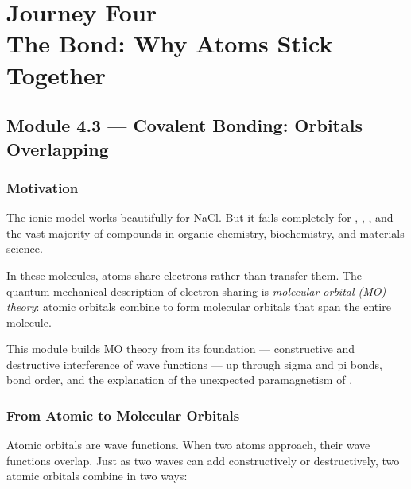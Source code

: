 \documentclass[12pt, a4paper]{book}
\newcommand{\newterm}[1]{\textit{\textcolor{DiscoveryColor}{#1}}}
\begin{document}
\setcounter{chapter}{3}
\chapter[Journey 4 --- The Bond]{Journey Four\\[8pt]
  \textcolor{ModuleColor}{\large The Bond: Why Atoms Stick Together}}
\setcounter{section}{2}

\section{Module 4.3 --- Covalent Bonding: Orbitals Overlapping}

\subsection*{Motivation}

The ionic model works beautifully for NaCl.
But it fails completely for , , ,
and the vast majority of compounds in organic chemistry,
biochemistry, and materials science.

In these molecules, atoms share electrons rather than
transfer them.
The quantum mechanical description of electron sharing
is \newterm{molecular orbital (MO) theory}:
atomic orbitals combine to form molecular orbitals
that span the entire molecule.

This module builds MO theory from its foundation ---
constructive and destructive interference of wave functions ---
up through sigma and pi bonds, bond order, and the
explanation of the unexpected paramagnetism of .

\subsection{From Atomic to Molecular Orbitals}

Atomic orbitals are wave functions.
When two atoms approach, their wave functions overlap.
Just as two waves can add constructively or destructively,
two atomic orbitals combine in two ways:
\end{document}
